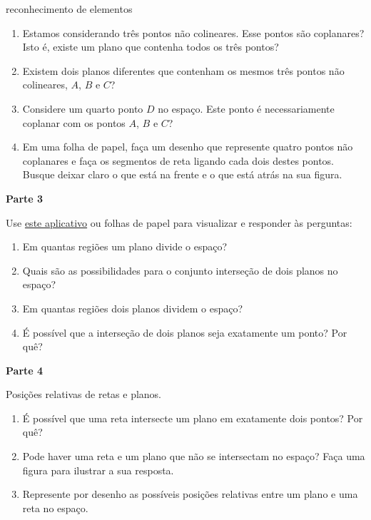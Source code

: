 \begin{task}{reconhecimento de elementos}
\begin{enumerate}
\item {} 
Estamos considerando três pontos não colineares. Esse pontos são coplanares? Isto é, existe um plano que contenha todos os três pontos?

\item {} 
Existem dois planos diferentes que contenham os mesmos três pontos não colineares, \(A\), \(B\) e \(C\)?

\item {} 
Considere um quarto ponto \(D\) no espaço. Este ponto é necessariamente coplanar com os pontos \(A\), \(B\) e \(C\)?

\item {} 
Em uma folha de papel, faça um desenho que represente quatro pontos não coplanares e faça os segmentos de reta ligando cada dois destes pontos. Busque deixar claro o que está na frente e o que está atrás na sua figura.

\end{enumerate}

\textbf{Parte 3}

Use \href{https://ggbm.at/ar9et3rv}{este aplicativo} ou folhas de papel para visualizar e responder às perguntas:
\begin{enumerate}
\item {} 
Em quantas regiões um plano divide o espaço?

\item {} 
Quais são as possibilidades para o conjunto interseção de dois planos no espaço?

\item {} 
Em quantas regiões dois planos dividem o espaço?

\item {} 
É possível que a interseção de dois planos seja exatamente um ponto? Por quê?

\end{enumerate}

\textbf{Parte 4}

Posições relativas de retas e planos.
\begin{enumerate}
\item {} 
É possível que uma reta intersecte um plano em exatamente dois pontos? Por quê?

\item {} 
Pode haver uma reta e um plano que não se intersectam no espaço? Faça uma figura para ilustrar a sua resposta.

\item {} 
Represente por desenho as possíveis posições relativas entre um plano e uma reta no espaço.


\end{enumerate}
\end{task}
